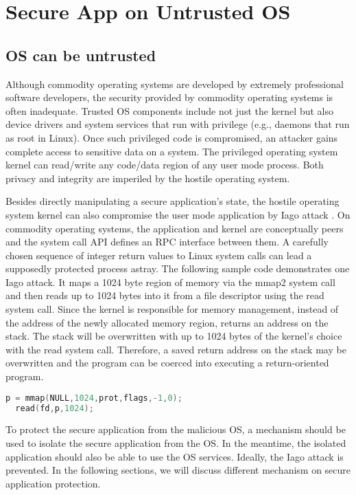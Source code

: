 \section{Secure App on Untrusted OS}
\label{sec:problem1}

\subsection{OS can be untrusted}

Although commodity operating systems are developed by extremely professional
software developers, the security provided by commodity operating systems is
often inadequate. Trusted OS components include not just the kernel but also
device drivers and system services that run with privilege (e.g., daemons that
run as root in Linux). Once such privileged code is compromised, an attacker
gains complete access to sensitive data on a system. The privileged operating
system kernel can read/write any code/data region of any user mode process. Both
privacy and integrity are imperiled by the hostile operating system.

Besides directly manipulating a secure application's state, the hostile
operating system kernel can also compromise the user mode application by Iago
attack \cite{Iago}. On commodity operating systems, the application and kernel
are conceptually peers and the system call API defines an RPC interface between
them. A carefully chosen sequence of integer return values to Linux system calls
can lead a supposedly protected process astray. The following sample code
demonstrates one Iago attack. It maps a 1024 byte region of memory via the mmap2
system call and then reads up to 1024 bytes into it from a file descriptor using
the read system call. Since the kernel is responsible for memory management,
instead of the address of the newly allocated memory region, returns an address
on the stack.  The stack will be overwritten with up to 1024 bytes of the
kernel's choice with the read system call. Therefore, a saved return address on
the stack may be overwritten and the program can be coerced into executing a
return-oriented program.

\begin{lstlisting}[language=C]
  p = mmap(NULL,1024,prot,flags,-1,0);
  read(fd,p,1024);
\end{lstlisting}

To protect the secure application from the malicious OS, a mechanism should be
used to isolate the secure application from the OS. In the meantime, the
isolated application should also be able to use the OS services. Ideally, the
Iago attack is prevented. In the following sections, we will discuss different
mechanism on secure application protection.

